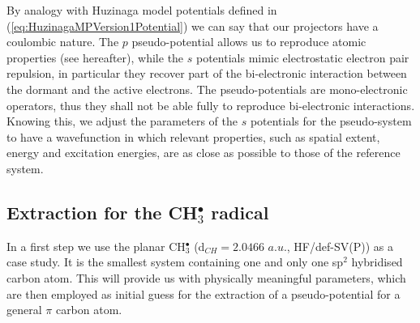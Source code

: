 \documentclass[aip]{revtex4-1}
\begin{document}
By analogy with Huzinaga model potentials defined in (\ref{eq:HuzinagaMPVersion1Potential})
we can say that our projectors have a coulombic nature.
The \(p\) pseudo-potential allows us to reproduce atomic properties (see hereafter), while the
\(s\) potentials mimic electrostatic electron pair repulsion, in particular they 
recover part of the bi-electronic interaction
between the dormant and the active electrons. The pseudo-potentials are mono-electronic operators, thus they shall not be able fully to reproduce bi-electronic interactions. Knowing this, we adjust the parameters of the \(s\) potentials for the pseudo-system to have a wavefunction in which relevant properties, such as spatial extent, energy and excitation energies, are as close as possible to those of the reference system.

\subsection{Extraction for the CH$_3^\bullet$ radical}
\label{section:potential_derivation}

In a first step we use the planar CH\(^{\bullet}_{3}\) (d$_{CH}=2.0466$ $a.u.$, HF/def-SV(P)) as 
a case study.
It is the smallest system containing one and only one sp$^2$ hybridised carbon atom.
This will provide us with physically meaningful parameters, which are then employed as
initial guess for the extraction of a pseudo-potential for a general $\pi$ carbon atom.
\end{document}

